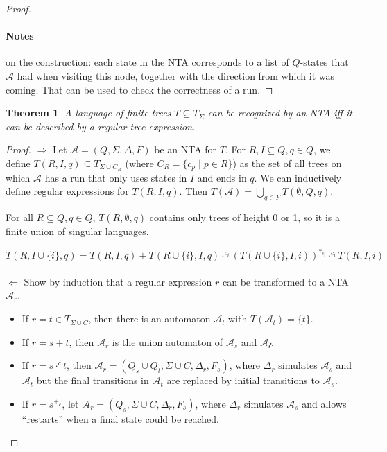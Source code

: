 \documentclass{article}
\newtheorem{theorem}{Theorem}
\begin{document}
\begin{proof}
	\paragraph{Notes} on the construction: each state in the NTA corresponds to a list of $Q$-states that $\mathcal{A}$ had when visiting this node, together with the direction from which it was coming. That can be used to check the correctness of a run.
\end{proof}

\vspace{1cm}
\begin{theorem}
\label{tre_fromto_nta}
	A language of finite trees $T \subseteq T_\Sigma$ can be recognized by an NTA iff it can be described by a regular tree expression.
\end{theorem}
\begin{proof}
	$\bm{\Rightarrow}$ Let $\mathcal{A} = (Q, \Sigma, \Delta, F)$ be an NTA for $T$. For $R, I \subseteq Q, q \in Q$, we define $T(R, I, q) \subseteq T_{\Sigma \cup C_R}$ (where $C_R = \{c_p \mid p \in R\}$) as the set of all trees on which $\mathcal{A}$ has a run that only uses states in $I$ and ends in $q$. We can inductively define regular expressions for $T(R, I, q)$. Then $T(\mathcal{A}) = \bigcup\limits_{q \in F} T(\emptyset, Q, q)$.
	
	For all $R \subseteq Q, q \in Q$, $T(R, \emptyset, q)$ contains only trees of height 0 or 1, so it is a finite union of singular languages.
	
	$$T(R, I \cup \{i\}, q) = T(R, I, q) + T(R \cup \{i\}, I, q) \cdot^{c_i} (T(R \cup \{i\}, I, i))^{*_{c_i}} \cdot^{c_i} T(R, I, i)$$ \\
	
	$\bm{\Leftarrow}$ Show by induction that a regular expression $r$ can be transformed to a NTA $\mathcal{A}_r$.
	\begin{itemize}
		\item If $r = t \in T_{\Sigma \cup C}$, then there is an automaton $\mathcal{A}_t$ with $T(\mathcal{A}_t) = \{t\}$.
		\item If $r = s + t$, then $\mathcal{A}_r$ is the union automaton of $\mathcal{A}_s$ and $\mathcal{A_t}$.
		\item If $r = s \cdot^c t$, then $\mathcal{A}_r = (Q_s \cup Q_t, \Sigma \cup C, \Delta_r, F_s)$, where $\Delta_r$ simulates $\mathcal{A}_s$ and $\mathcal{A}_t$ but the final transitions in $\mathcal{A}_t$ are replaced by initial transitions to $\mathcal{A}_s$.
		\item If $r = s^{+_c}$, let $\mathcal{A}_r = (Q_s, \Sigma \cup C, \Delta_r, F_s)$, where $\Delta_r$ simulates $\mathcal{A}_s$ and allows ``restarts'' when a final state could be reached.
	\end{itemize}
\end{proof}
\end{document}
